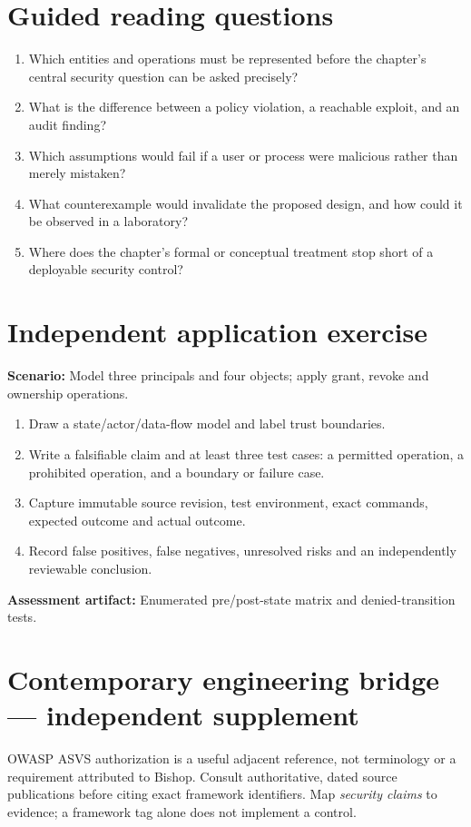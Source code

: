 \documentclass[10pt,letterpaper]{article}
\begin{document}
\section{Guided reading questions}
\begin{enumerate}
\item Which entities and operations must be represented before the chapter's central security question can be asked precisely?
\item What is the difference between a policy violation, a reachable exploit, and an audit finding?
\item Which assumptions would fail if a user or process were malicious rather than merely mistaken?
\item What counterexample would invalidate the proposed design, and how could it be observed in a laboratory?
\item Where does the chapter's formal or conceptual treatment stop short of a deployable security control?
\end{enumerate}
\section{Independent application exercise}
\textbf{Scenario:} Model three principals and four objects; apply grant, revoke and ownership operations.
\begin{enumerate}
\item Draw a state/actor/data-flow model and label trust boundaries.
\item Write a falsifiable claim and at least three test cases: a permitted operation, a prohibited operation, and a boundary or failure case.
\item Capture immutable source revision, test environment, exact commands, expected outcome and actual outcome.
\item Record false positives, false negatives, unresolved risks and an independently reviewable conclusion.
\end{enumerate}
\textbf{Assessment artifact:} Enumerated pre/post-state matrix and denied-transition tests.
\section{Contemporary engineering bridge --- independent supplement}
OWASP ASVS authorization is a useful adjacent reference, not terminology or a requirement attributed to Bishop. Consult authoritative, dated source publications before citing exact framework identifiers. Map \emph{security claims} to evidence; a framework tag alone does not implement a control.
\end{document}
